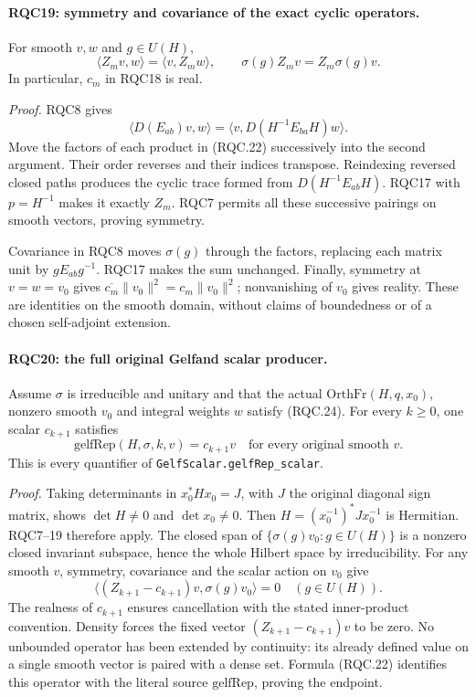 \documentclass[11pt,a4paper]{article}
\numberwithin{equation}{section}
\theoremstyle{remark}\newtheorem{remark}[theorem]{Remark}
\begin{document}
\paragraph{RQC19: symmetry and covariance of the exact cyclic operators.}
\label{claim:RQC19}
For smooth \(v,w\) and \(g\in U(H)\),
\[
 \langle Z_mv,w\rangle=\langle v,Z_mw\rangle,\qquad
 \sigma(g)Z_mv=Z_m\sigma(g)v.
 \tag{RQC.26}
\]
In particular, \(c_m\) in RQC18 is real.

\emph{Proof.}
RQC8 gives
\[
 \langle D(E_{ab})v,w\rangle
  =\langle v,D(H^{-1}E_{ba}H)w\rangle.
 \tag{RQC.27}
\]
Move the factors of each product in (RQC.22) successively into
the second argument.  Their order reverses and their indices
transpose.  Reindexing reversed closed paths produces the cyclic
trace formed from \(D(H^{-1}E_{ab}H)\).
RQC17 with \(p=H^{-1}\) makes it exactly \(Z_m\).
RQC7 permits all these successive pairings on smooth vectors,
proving symmetry.

Covariance in RQC8 moves \(\sigma(g)\) through the factors,
replacing each matrix unit by \(gE_{ab}g^{-1}\).
RQC17 makes the sum unchanged.
Finally, symmetry at \(v=w=v_0\) gives
\(\overline{c_m}\|v_0\|^2=c_m\|v_0\|^2\);
nonvanishing of \(v_0\) gives reality.
These are identities on the smooth domain, without claims of
boundedness or of a chosen self-adjoint extension.

\paragraph{RQC20: the full original Gelfand scalar producer.}
\label{claim:RQC20}
Assume \(\sigma\) is irreducible and unitary and that the actual
\(\mathrm{OrthFr}(H,q,x_0)\), nonzero smooth \(v_0\) and integral
weights \(w\) satisfy (RQC.24).
For every \(k\ge0\), one scalar \(c_{k+1}\) satisfies
\[
 \mathrm{gelfRep}(H,\sigma,k,v)=c_{k+1}v
 \quad\text{for every original smooth }v.
 \tag{RQC.28}
\]
This is every quantifier of \texttt{GelfScalar.gelfRep\_scalar}.

\emph{Proof.}
Taking determinants in \(x_0^*Hx_0=J\), with \(J\) the original
diagonal sign matrix, shows \(\det H\ne0\) and \(\det x_0\ne0\).
Then \(H=(x_0^{-1})^*Jx_0^{-1}\) is Hermitian.
RQC7--19 therefore apply.
The closed span of \(\{\sigma(g)v_0:g\in U(H)\}\) is a nonzero
closed invariant subspace, hence the whole Hilbert space by
irreducibility.
For any smooth \(v\), symmetry, covariance and the scalar action
on \(v_0\) give
\[
 \langle(Z_{k+1}-c_{k+1})v,\sigma(g)v_0\rangle=0
 \quad(g\in U(H)).
 \tag{RQC.29}
\]
The realness of \(c_{k+1}\) ensures cancellation with the stated
inner-product convention.
Density forces the fixed vector
\((Z_{k+1}-c_{k+1})v\) to be zero.
No unbounded operator has been extended by continuity: its
already defined value on a single smooth vector is paired with a
dense set.  Formula (RQC.22) identifies this operator with the
literal source \(\mathrm{gelfRep}\), proving the endpoint.
\end{document}
